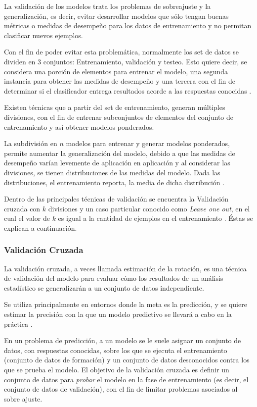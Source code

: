 La validación de los modelos trata los problemas de sobreajuste y la generalización, es decir, evitar desarrollar modelos que sólo tengan buenas métricas o medidas de desempeño para los datos de entrenamiento y no permitan clasificar nuevos ejemplos. 

Con el fin de poder evitar esta problemática, normalmente los set de datos se dividen en 3 conjuntos: Entrenamiento, validación y testeo. Esto quiere decir, se considera una porción de elementos para entrenar el modelo, una segunda instancia para obtener las medidas de desempeño y una tercera con el fin de determinar si el clasificador entrega resultados acorde a las respuestas conocidas \cite{kohavi1995study}.

Existen técnicas que a partir del set de entrenamiento, generan múltiples divisiones, con el fin de entrenar subconjuntos de elementos del conjunto de entrenamiento y así obtener modelos ponderados.

La subdivisión en $n$ modelos para entrenar y generar modelos ponderados, permite aumentar la generalización del modelo, debido a que las medidas de desempeño varían levemente de aplicación en aplicación y al considerar las divisiones, se tienen distribuciones de las medidas del modelo. Dada las distribuciones, el entrenamiento reporta, la media de dicha distribución \cite{golub1979generalized}. 

Dentro de las principales técnicas de validación se encuentra la Validación cruzada con $k$ divisiones \cite{golub1979generalized} y un caso particular conocido como \textit{Leave one out}, en el cual el valor de $k$ es igual a la cantidad de ejemplos en el entrenamiento \cite{vehtari2017practical}. Éstas se explican a continuación.

\subsubsection{Validación Cruzada}

La validación cruzada, a veces llamada estimación de la rotación, es una técnica de validación del
modelo para evaluar cómo los resultados de un análisis estadístico se generalizarán a un conjunto de datos independiente. 

Se utiliza principalmente en entornos donde la meta es la predicción, y se
quiere estimar la precisión con la que un modelo predictivo se llevará a cabo en la práctica \cite{golub1979generalized}. 

En un problema de predicción, a un modelo se le suele asignar un conjunto de datos, con respuestas conocidas, sobre los que se ejecuta el entrenamiento (conjunto de datos de formación) y un conjunto de datos desconocidos contra los que se prueba el modelo. El objetivo de la validación cruzada es definir un conjunto de datos para \textit{probar} el modelo en la fase de entrenamiento (es decir, el conjunto de datos de validación), con el fin de limitar problemas asociados al sobre ajuste.

